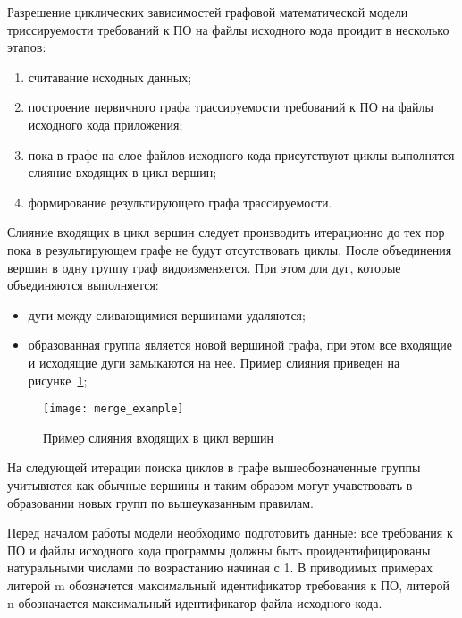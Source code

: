 Разрешение циклических зависимостей графовой математической модели триссируемости требований к ПО на файлы исходного кода проидит в несколько этапов:
\begin{enumerate}
    \item считавание исходных данных;
    \item построение первичного графа трассируемости требований к ПО на файлы исходного кода приложения;
    \item пока в графе на слое файлов исходного кода присутствуют циклы выполнятся слияние входящих в цикл вершин;
    \item формирование результирующего графа трассируемости.
\end{enumerate}

Слияние входящих в цикл вершин следует производить итерационно до тех пор пока в результирующем графе не будут отсутствовать циклы. После объединения вершин в одну группу граф видоизменяется. При этом для дуг, которые объединяются выполняется:
\begin{itemize}
    \item дуги между сливающимися вершинами удаляются;
    \item образованная группа является новой вершиной графа, при этом все входящие и исходящие дуги замыкаются на нее. Пример слияния приведен на рисунке~\ref{fig:merge_example};
\end{itemize}

\begin{figure}[H]
    \centering
    \texttt{[image: merge\_example]}
    \caption{Пример слияния входящих в цикл вершин}
    \label{fig:merge_example}
\end{figure}

На следующей итерации поиска циклов в графе вышеобозначенные группы учитывются как обычные вершины и таким образом могут учавствовать в образовании новых групп по вышеуказанным правилам.

Перед началом работы модели необходимо подготовить данные: все требования к ПО и файлы исходного кода программы должны быть проидентифицированы натуральными числами по возрастанию начиная с 1. В приводимых примерах литерой m обозначется максимальный идентификатор требования к ПО, литерой n обозначается максимальный идентификатор файла исходного кода.

